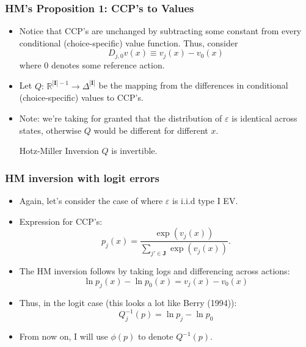 \documentclass[xcolor=pdftex,dvipsnames,table,mathserif]{beamer}
\begin{document}
\begin{frame}
\frametitle{HM's Proposition 1: CCP's to Values}
\begin{itemize}
	\item Notice that CCP's are unchanged by subtracting some constant from every conditional (choice-specific) value function. Thus, consider\[
	D_{j,0} v\left(x\right) \equiv v_{j}\left(x\right) - v_{0}\left(x\right)
	\]
	where $0$ denotes some reference action.
	
	\medskip
	\item Let $Q:\, \mathbb{R}^{\left| \mathbf{I}\right|-1} \rightarrow \Delta^{\left| \mathbf{I}\right|}$ be the mapping
	from the differences in conditional (choice-specific) values to CCP's.

	\medskip
	\item Note: we're taking for granted that the distribution of $\varepsilon$ is identical across states, otherwise
	$Q$ would be different for different $x$.

	\begin{block}{Hotz-Miller Inversion}
	$Q$ is invertible.
	\end{block}

\end{itemize}
\end{frame}

\begin{frame}
\frametitle{HM inversion with logit errors}
\begin{itemize}
	\item Again, let's consider the case of where $\varepsilon$ is i.i.d type I EV.

	\smallskip
	\item Expression for CCP's: \[
	p_{j}\left(x\right) = \frac{\exp\left(v_{j}\left(x\right)\right)}{\sum_{j'\in \mathbf{J}}\exp\left(v_{j}\left(x\right)\right)}.
	\]

	\smallskip
	\item The HM inversion follows by taking logs and differencing across actions: \[
		\ln p_{j}\left(x\right) - \ln p_{0}\left(x\right) = v_{j}\left(x\right) - v_{0}\left(x\right)
	\]

	\smallskip
	\item Thus, in the logit case (this looks a lot like Berry (1994)):
	\[
	Q_{j}^{-1} \left( p \right) = \ln p_{j} - \ln p_{0}
	\]

	\smallskip
	\item From now on, I will use $\phi(p)$ to denote $Q^{-1}(p)$.

\end{itemize}
\end{frame}
\end{document}
